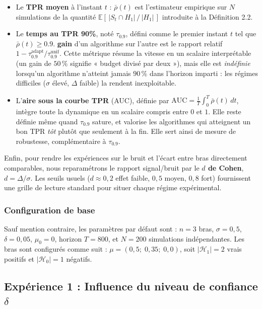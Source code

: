 \documentclass[10.5pt,a4paper]{article}
\begin{document}
\begin{itemize}
  \item Le \textbf{TPR moyen} à l'instant $t$ :
  $\bar{\rho}(t)$ est l'estimateur empirique sur $N$ simulations de la quantité $\mathbb{E}\!\left[\,|S_t \cap H_1| \,/\, |H_1|\,\right]$ introduite à la Définition 2.2.
  \item Le \textbf{temps au TPR 90\%}, noté $\tau_{0.9}$, défini comme
  le premier instant $t$ tel que $\bar{\rho}(t) \geq 0.9$.
  \textbf{gain} d'un algorithme sur l'autre est le rapport relatif
  $1-\tau_{0.9}^{\text{adapt}}/\tau_{0.9}^{\text{unif}}$. Cette
  métrique résume la vitesse en un scalaire interprétable
  (un gain de $50\,\%$ signifie « budget divisé par deux »), mais
  elle est \emph{indéfinie} lorsqu'un algorithme n'atteint jamais
  $90\,\%$ dans l'horizon imparti : les régimes difficiles
  ($\sigma$ élevé, $\Delta$ faible) la rendent inexploitable.

  \item L'\textbf{aire sous la courbe TPR} (AUC), définie par
  $\mathrm{AUC} = \frac{1}{T}\int_0^T \bar{\rho}(t)\,dt$, intègre
  toute la dynamique en un scalaire compris entre $0$ et $1$. Elle
  reste définie même quand $\tau_{0.9}$ sature, et valorise les
  algorithmes qui atteignent un bon TPR \emph{tôt} plutôt que
  seulement à la fin. Elle sert ainsi de mesure de robustesse,
  complémentaire à $\tau_{0.9}$.
\end{itemize}
Enfin, pour rendre les expériences sur le bruit et l'écart entre bras
directement comparables, nous reparamétrons le rapport signal/bruit
par le \textbf{$d$ de Cohen}, $d = \Delta/\sigma$. Les seuils usuels ($d\approx 0{,}2$ effet
faible, $0{,}5$ moyen, $0{,}8$ fort) fournissent une grille de lecture
standard pour situer chaque régime expérimental.

\subsubsection{Configuration de base}

Sauf mention contraire, les paramètres par défaut sont :
$n = 3$ bras, $\sigma = 0{,}5$, $\delta = 0{,}05$, $\mu_0 = 0$,
horizon $T = 800$, et $N = 200$ simulations indépendantes.
Les bras sont configurés comme suit :
$\mu = (0{,}5;\; 0{,}35;\; 0{,}0)$,
soit $|\mathcal{H}_1| = 2$ vrais positifs et
$|\mathcal{H}_0| = 1$ négatifs.

\subsection{Expérience 1 : Influence du niveau de confiance $\delta$}
\end{document}
